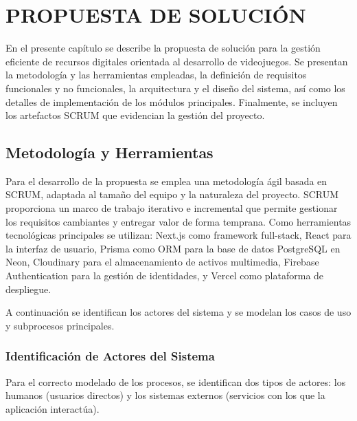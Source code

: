  \chapter{PROPUESTA DE SOLUCIÓN}
\label{chap:chapter2}

En el presente capítulo se describe la propuesta de solución para la gestión eficiente de recursos digitales orientada al desarrollo de videojuegos. Se presentan la metodología y las herramientas empleadas, la definición de requisitos funcionales y no funcionales, la arquitectura y el diseño del sistema, así como los detalles de implementación de los módulos principales. Finalmente, se incluyen los artefactos SCRUM que evidencian la gestión del proyecto.

\section{Metodología y Herramientas}
\label{sec:metodologia}

Para el desarrollo de la propuesta se emplea una metodología ágil basada en SCRUM, adaptada al tamaño del equipo y la naturaleza del proyecto. SCRUM proporciona un marco de trabajo iterativo e incremental que permite gestionar los requisitos cambiantes y entregar valor de forma temprana. Como herramientas tecnológicas principales se utilizan: Next.js como framework full-stack, React para la interfaz de usuario, Prisma como ORM para la base de datos PostgreSQL en Neon, Cloudinary para el almacenamiento de activos multimedia, Firebase Authentication para la gestión de identidades, y Vercel como plataforma de despliegue.

A continuación se identifican los actores del sistema y se modelan los casos de uso y subprocesos principales.

\subsection{Identificación de Actores del Sistema}

Para el correcto modelado de los procesos, se identifican dos tipos de actores: los humanos (usuarios directos) y los sistemas externos (servicios con los que la aplicación interactúa).

